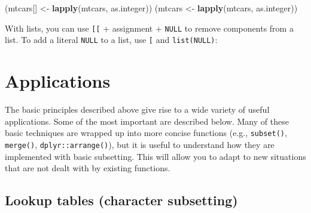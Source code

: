 \documentclass[]{book}
\newenvironment{Shaded}{\begin{snugshade}}{\end{snugshade}}
\newcommand{\KeywordTok}[1]{\textcolor[rgb]{0.13,0.29,0.53}{\textbf{#1}}}
\newcommand{\DataTypeTok}[1]{\textcolor[rgb]{0.13,0.29,0.53}{#1}}
\newcommand{\DecValTok}[1]{\textcolor[rgb]{0.00,0.00,0.81}{#1}}
\newcommand{\StringTok}[1]{\textcolor[rgb]{0.31,0.60,0.02}{#1}}
\newcommand{\CommentTok}[1]{\textcolor[rgb]{0.56,0.35,0.01}{\textit{#1}}}
\newcommand{\OtherTok}[1]{\textcolor[rgb]{0.56,0.35,0.01}{#1}}
\newcommand{\NormalTok}[1]{#1}
\theoremstyle{definition}
\theoremstyle{definition}
\theoremstyle{definition}
\theoremstyle{remark}
\begin{document}
\begin{Shaded}
\begin{Highlighting}[]
\NormalTok{(mtcars[] <-}\StringTok{ }\KeywordTok{lapply}\NormalTok{(mtcars, as.integer))}
\NormalTok{(mtcars <-}\StringTok{ }\KeywordTok{lapply}\NormalTok{(mtcars, as.integer))}
\end{Highlighting}
\end{Shaded}

With lists, you can use \texttt{{[}{[}} + assignment + \texttt{NULL} to
remove components from a list. To add a literal \texttt{NULL} to a list,
use \texttt{{[}} and \texttt{list(NULL)}:

\begin{Shaded}
\end{Shaded}

\section{Applications}\label{applications}

The basic principles described above give rise to a wide variety of
useful applications. Some of the most important are described below.
Many of these basic techniques are wrapped up into more concise
functions (e.g., \texttt{subset()}, \texttt{merge()},
\texttt{dplyr::arrange()}), but it is useful to understand how they are
implemented with basic subsetting. This will allow you to adapt to new
situations that are not dealt with by existing functions.

\subsection{Lookup tables (character
subsetting)}\label{lookup-tables-character-subsetting}
\end{document}
